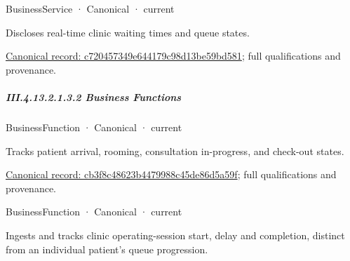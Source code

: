 \label{navigation:III.4.13.2.1.3.1.1}

\label{element:c720457349e644179c98d13be59bd581}
{\small BusinessService · Canonical · current}\par

Discloses real-time clinic waiting times and queue states.


{\footnotesize \href{../../../../../../../continuum/business/business-service/c720457349e644179c98d13be59bd581.md}{Canonical record: c720457349e644179c98d13be59bd581}; full qualifications and provenance.}\par
\subparagraph*{III.4.13.2.1.3.2 Business Functions}
\label{navigation:III.4.13.2.1.3.2}

\label{navigation:III.4.13.2.1.3.2.1}

\label{element:cb3f8c48623b4479988c45de86d5a59f}
{\small BusinessFunction · Canonical · current}\par

Tracks patient arrival, rooming, consultation in-progress, and check-out states.


{\footnotesize \href{../../../../../../../continuum/business/business-function/cb3f8c48623b4479988c45de86d5a59f.md}{Canonical record: cb3f8c48623b4479988c45de86d5a59f}; full qualifications and provenance.}\par
{}
\label{navigation:III.4.13.2.1.3.2.2}

\label{element:83a85a08803c4c00b8de4a38e8c9d77e}
{\small BusinessFunction · Canonical · current}\par

Ingests and tracks clinic operating-session start, delay and completion, distinct from an individual patient's queue progression.



